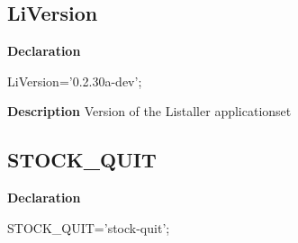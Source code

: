 \documentclass{report}
\newif\ifpdf
\begin{document}
\subsection*{LiVersion}
\fi
\label{licommon-LiVersion}
\begin{list}{}{
\setlength{\itemindent}{0cm}
\setlength{\listparindent}{0cm}
\setlength{\leftmargin}{\evensidemargin}
\addtolength{\leftmargin}{\tmplength}
\settowidth{\labelsep}{X}
\addtolength{\leftmargin}{\labelsep}
\setlength{\labelwidth}{\tmplength}
}
\item[\textbf{Declaration}\hfill]
\ifpdf
\begin{flushleft}
\fi
\begin{ttfamily}
LiVersion='0.2.30a-dev';\end{ttfamily}

\ifpdf
\end{flushleft}
\fi

\par
\item[\textbf{Description}]
Version of the Listaller applicationset

\end{list}
\ifpdf
\subsection*{\large{\textbf{STOCK{\_}QUIT}}\normalsize\hspace{1ex}\hrulefill}
\else
\subsection*{STOCK{\_}QUIT}
\fi
\label{licommon-STOCK_QUIT}
\begin{list}{}{
\setlength{\itemindent}{0cm}
\setlength{\listparindent}{0cm}
\setlength{\leftmargin}{\evensidemargin}
\addtolength{\leftmargin}{\tmplength}
\settowidth{\labelsep}{X}
\addtolength{\leftmargin}{\labelsep}
\setlength{\labelwidth}{\tmplength}
}
\item[\textbf{Declaration}\hfill]
\ifpdf
\begin{flushleft}
\fi
\begin{ttfamily}
STOCK{\_}QUIT='stock-quit';\end{ttfamily}

\ifpdf
\end{flushleft}
\fi

\end{list}
\ifpdf
\end{document}

